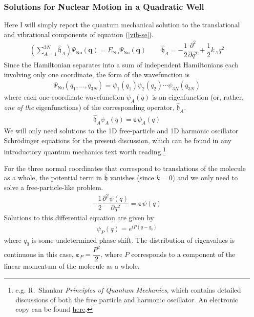 \documentclass[11pt]{article}
\newcommand{\bo}[1]{\ensuremath{\mathbf{#1}}}
\renewcommand{\sp}{\ \ \ \ \ \ \ \ \ \ }
\newcommand{\fr}[2]{\dfrac{#1}{#2}}
\newcommand{\pr}[1]{\left(#1\right)}
\newcommand{\pd}[3]{\ensuremath{ \dfrac{ \partial^{#1} #2 }{\partial #3 ^{#1}}}}
\newcommand{\ld}{\ensuremath{\ldots}}
\newcommand{\Nu}{\ensuremath{\mathrm{Nu}}}
\newcommand{\op}[1]{\ensuremath{\hat{#1}}}
\newcommand{\Y}{\ensuremath{\Psi}}
\newcommand{\y}{\ensuremath{\psi}}
\newcommand{\mf}[1]{\ensuremath{\mathfrak{#1}}}
\newcommand{\e}{\ensuremath{\bm\varepsilon}}
\begin{document}
\subsubsection*{Solutions for Nuclear Motion in a Quadratic Well}
Here I will simply report the quantum mechanical solution to the translational
and vibrational components of equation (\ref{vib-se}).
\begin{align*}
\pr{\sum_{A=1}^{3N}
    \op{\mf{h}}_A }
    \Y_\Nu(\bo{q})
=
    E_\Nu
    \Y_\Nu(\bo{q})
\sp
    \op{\mf{h}}_A
=
-\fr{1}{2}
    \pd{2}{}{q}
+\fr{1}{2}
    k_A q^2
\end{align*}
Since the Hamiltonian separates into a sum of independent Hamiltonians each
involving only one coordinate, the form of the wavefunction is
\begin{align}
    \Y_\Nu(q_1,\ld,q_{3N})
=
    \y_1(q_1)
    \y_2(q_2)
    \cdots
    \y_{3N}(q_{3N})
\end{align}
where each one-coordinate wavefunction $\y_A(q)$ is an eigenfunction (or,
rather, {\it one of the} eigenfunctions) of the corresponding operator,
$\op{\mf{h}}_A$.
\begin{align}
    \op{\mf{h}}_A
    \y_A(q)
=
    \e
    \y_A(q)
\end{align}
We will only need solutions to the 1D free-particle and 1D harmonic oscillator
Schr\"odinger equations for the present discussion, which can be found in any
introductory quantum mechanics text worth reading.\footnote{e.g. R.\ Shankar
{\it Principles of Quantum Mechanics}, which contains detailed discussions of
both the free particle and harmonic oscillator. An electronic copy can be found
\href{http://home.basu.ac.ir/\~psu/Books/\%5BRamamurti_Shankar\%5D_Principles_of_Quantum_Mechanic\%28BookFi.org\%29.pdf}{here}.}

For the three normal coordinates that correspond to translations of the
molecule as a whole, the potential term in $\op{\mf{h}}$ vanishes (since
$k=0$) and we only need to solve a free-particle-like problem.
\begin{align}
-\fr{1}{2}
    \pd{2}{\y(q)}{q}
=
    \e
    \y(q)
\end{align}
Solutions to this differential equation are given by
\begin{align}
    \y_{P}(q)
=
    e^{iP(q-q_0)}
\end{align}
where $q_0$ is some undetermined phase shift. The distribution of
eigenvalues is continuous in this case, $\e_{P}=\fr{P^2}{2}$, where $P$
corresponds to a component of the linear momentum of the molecule as a whole.
\end{document}
